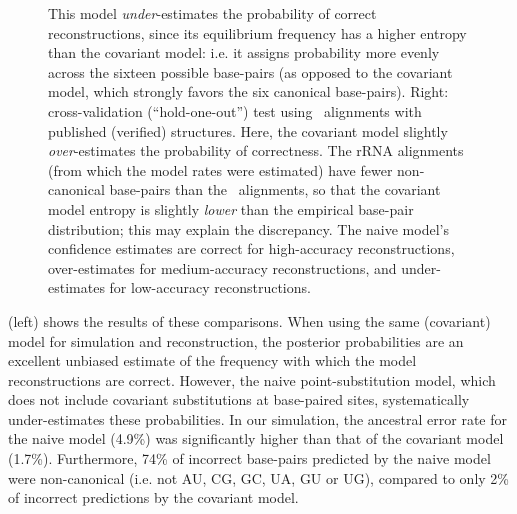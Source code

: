 \documentclass[10pt]{article}
\begin{document}
\begin{figure}[ht]
{    This model {\em under}-estimates the probability of correct reconstructions,
    since its equilibrium frequency has a higher entropy than the covariant model:
    i.e. it assigns probability more evenly across the sixteen possible base-pairs (as opposed to the covariant model, which strongly favors the six canonical base-pairs).
    Right: cross-validation (``hold-one-out'') test using \RFAM\ alignments with published (verified) structures.
    Here, the covariant model slightly {\em over}-estimates the probability of correctness.
    The rRNA alignments (from which the model rates were estimated) have fewer non-canonical base-pairs than the \RFAM\ alignments,
    so that the covariant model entropy is slightly {\em lower} than the empirical base-pair distribution;
    this may explain the discrepancy.
    The naive model's confidence estimates are correct
    for high-accuracy reconstructions,
    over-estimates for medium-accuracy reconstructions,
    and under-estimates for low-accuracy reconstructions.
  }
\end{figure}

 (left) shows the results of these comparisons.
When using the same (covariant) model for simulation and reconstruction, the posterior probabilities are an excellent unbiased estimate of the frequency with which the model reconstructions are correct.
However, the naive point-substitution model, which does not include covariant substitutions at base-paired sites, systematically under-estimates these probabilities.
In our simulation, the ancestral error rate for the naive model (4.9\%) was significantly higher than that of the covariant model (1.7\%).
Furthermore, 74\% of incorrect base-pairs predicted by the naive model were non-canonical (i.e. not AU, CG, GC, UA, GU or UG),
compared to only 2\% of incorrect predictions by the covariant model.
\end{document}

